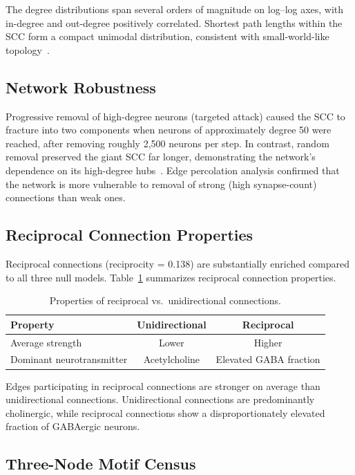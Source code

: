 \documentclass[11pt]{article}
\begin{document}
The degree distributions span several orders of magnitude on log--log axes, with in-degree and out-degree positively correlated.  Shortest path lengths within the SCC form a compact unimodal distribution, consistent with small-world-like topology~\citep{watts1998collective}.

\subsection{Network Robustness}

Progressive removal of high-degree neurons (targeted attack) caused the SCC to fracture into two components when neurons of approximately degree 50 were reached, after removing roughly 2,500 neurons per step.  In contrast, random removal preserved the giant SCC far longer, demonstrating the network's dependence on its high-degree hubs~\citep{barabasi1999emergence}.  Edge percolation analysis confirmed that the network is more vulnerable to removal of strong (high synapse-count) connections than weak ones.

\subsection{Reciprocal Connection Properties}

Reciprocal connections (reciprocity = 0.138) are substantially enriched compared to all three null models.  Table~\ref{tab:reciprocal} summarizes reciprocal connection properties.

\begin{table}[ht]
\centering
\caption{Properties of reciprocal vs.\ unidirectional connections.}
\label{tab:reciprocal}
\begin{tabular}{@{}lcc@{}}
\toprule
Property & Unidirectional & Reciprocal \\
\midrule
Average strength & Lower & Higher \\
Dominant neurotransmitter & Acetylcholine & Elevated GABA fraction \\
\bottomrule
\end{tabular}
\end{table}

Edges participating in reciprocal connections are stronger on average than unidirectional connections.  Unidirectional connections are predominantly cholinergic, while reciprocal connections show a disproportionately elevated fraction of GABAergic neurons.

\subsection{Three-Node Motif Census}
\end{document}
